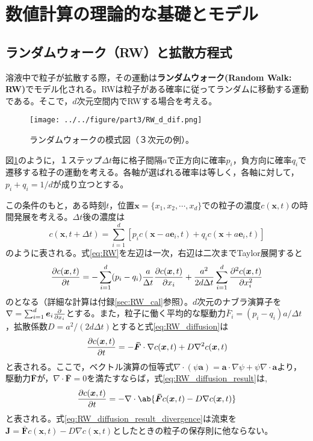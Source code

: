 \documentclass[autodetect-engine,dvi=dvipdfmx,a4paper,ja=standard,oneside,openany,11pt]{bxjsbook}
\begin{document}
\section{数値計算の理論的な基礎とモデル}
\subsection{ランダムウォーク（RW）と拡散方程式}
\label{sec:RW}
溶液中で粒子が拡散する際，その運動は\textbf{ランダムウォーク(Random Walk: RW)}でモデル化される。RWは粒子がある確率に従ってランダムに移動する運動である。そこで，$d$次元空間内でRWする場合を考える。
\begin{figure}[htbp]
  \centering
  \texttt{[image: ../../figure/part3/RW\_d\_dif.png]}
  \caption{ランダムウォークの模式図（３次元の例）。}
  \label{fig:random_walk}
\end{figure}
図\ref{fig:random_walk}のように，１ステップ$\Delta t$毎に格子間隔$a$で正方向に確率$p_i$，負方向に確率$q_i$で遷移する粒子の運動を考える。各軸が選ばれる確率は等しく，各軸に対して，$p_i+q_i=1/d$が成り立つとする。

この条件のもと，ある時刻$t$，位置$\bm{x}=\{x_1,x_2,\cdots,x_d\}$での粒子の濃度$c(\bm{x},t)$の時間発展を考える。$\Delta t$後の濃度は
\begin{equation}
  c(\bm{x},t+\Delta t)=\sum_{i=1}^{d}\left[p_i c(\bm{x}-a\bm{e}_i,t)+q_i c(\bm{x}+a\bm{e}_i,t)\right]
  \label{eq:RW}
\end{equation}
のように表される。式\eqref{eq:RW}を左辺は一次，右辺は二次までTaylor展開すると
\begin{equation}
  \pdv{c(\bm{x},t)}{t}=-\sum_{i=1}^{d}(p_i-q_i)\frac{a}{\Delta t}\pdv{c(\bm{x},t)}{x_i}+\frac{a^2}{2d\Delta t}\sum_{i=1}^{d}\pdv[2]{c(\bm{x},t)}{x_i}
  \label{eq:RW_diffusion}
\end{equation}
のとなる（詳細な計算は付録\ref{sec:RW_cal}参照）。$d$次元のナブラ演算子を$\nabla=\sum_{i=1}^{d}\bm{e}_i\pdv*{}{x_i}$とする。また，粒子に働く平均的な駆動力$\bar{F}_i=(p_i-q_i)a/\Delta t$，拡散係数$D=a^2/(2d\Delta t)$とすると式\eqref{eq:RW_diffusion}は
\begin{equation}
  \pdv{c(\bm{x},t)}{t}=-\bm{\bar{F}}\cdot\nabla c(\bm{x},t)+D\nabla^2 c(\bm{x},t)
  \label{eq:RW_diffusion_result}
\end{equation}
と表される。ここで，ベクトル演算の恒等式$\nabla\cdot(\psi\bm{a})=\bm{a}\cdot\nabla\psi+\psi\nabla\cdot\bm{a}$より，駆動力$\bar{\bm{F}}$が，$\nabla\cdot\bar{\bm{F}}=0$を満たすならば，式\ref{eq:RW_diffusion_result}は,
\begin{equation}
  \pdv{c(\bm{x},t)}{t}=-\nabla\cdot\ab\{\bm{\bar{F}}c(\bm{x},t)-D\nabla c(\bm{x},t)\}
  \label{eq:RW_diffusion_result_divergence}
\end{equation}
と表される。式\eqref{eq:RW_diffusion_result_divergence}は流束を$\bm{J}=\bm{\bar{F}}c(\bm{x},t)-D\nabla c(\bm{x},t)$としたときの粒子の保存則に他ならない。
\end{document}
